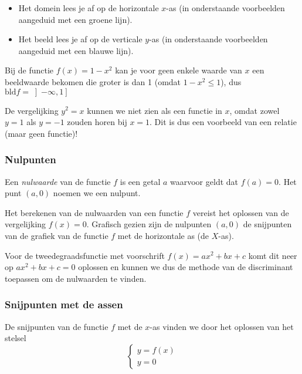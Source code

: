 \begin{ftonthoud}
\begin{itemize}
\item Het domein lees je af op de horizontale $x$-as (in onderstaande voorbeelden aangeduid met een groene lijn).
\item Het beeld lees je af op de verticale $y$-as (in onderstaande voorbeelden aangeduid met een blauwe lijn).
\end{itemize}
\end{ftonthoud}


\begin{voorbeeld}
Bij de functie $f(x)=1-x^{2}$ kan je voor geen
enkele waarde van $x$ een beeldwaarde bekomen die groter is dan 1 (omdat $1-x^2 \le 1$),
dus $\textrm{bld}f=\left]-\infty,1\right]$
\end{voorbeeld}

De vergelijking $y^2=x$ kunnen we niet zien als een functie in $x$, omdat zowel $y=1$ als $y=-1$ zouden horen bij $x=1$. Dit is dus een voorbeeld van een relatie (maar geen functie)!

\subsubsection{Nulpunten}

\begin{definitie}
	Een \emph{nulwaarde} van de functie $f$ is een getal $a$ waarvoor geldt dat $f(a)=0$. Het punt $(a,0)$ noemen we een nulpunt.
\end{definitie}

Het berekenen van de nulwaarden van een
functie $f$ vereist het oplossen van de vergelijking $f(x)=0$.
Grafisch gezien zijn de nulpunten $(a,0)$ de snijpunten van de grafiek
van de functie $f$ met de horizontale as (de $X$-as).

\begin{voorbeeld}
	Voor de tweedegraadsfunctie met voorschrift $f(x)=ax^2+bx+c$ komt dit neer op $ax^2+bx+c=0$ oplossen en kunnen we dus de methode van de discriminant toepassen om de nulwaarden te vinden.
\end{voorbeeld}

\subsubsection{Snijpunten met de assen}

De snijpunten van de functie $f$ met de $x$-as vinden
we door het oplossen van het stelsel
\begin{equation*}
\begin{cases}
y=f(x)\\
y=0
\end{cases}
\end{equation*}


